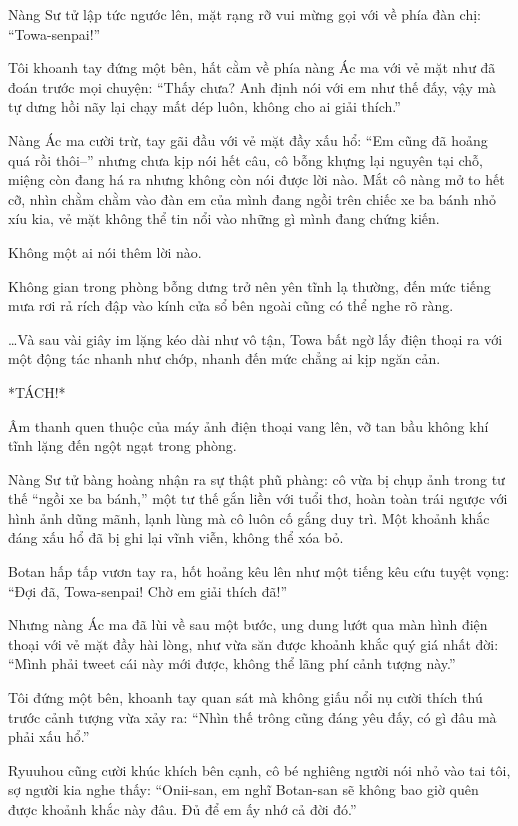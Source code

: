 \documentclass[../main.tex]{subfiles}
\begin{document}
Nàng Sư tử lập tức ngước lên, mặt rạng rỡ vui mừng gọi với về phía đàn chị: ``Towa-senpai!''

Tôi khoanh tay đứng một bên, hất cằm về phía nàng Ác ma với vẻ mặt như đã đoán trước mọi chuyện: ``Thấy chưa? Anh định nói với em như thế đấy, vậy mà tự dưng hồi nãy lại chạy mất dép luôn, không cho ai giải thích.''

Nàng Ác ma cười trừ, tay gãi đầu với vẻ mặt đầy xấu hổ: ``Em cũng đã hoảng quá rồi thôi--'' nhưng chưa kịp nói hết câu, cô bỗng khựng lại nguyên tại chỗ, miệng còn đang há ra nhưng không còn nói được lời nào. Mắt cô nàng mở to hết cỡ, nhìn chằm chằm vào đàn em của mình đang ngồi trên chiếc xe ba bánh nhỏ xíu kia, vẻ mặt không thể tin nổi vào những gì mình đang chứng kiến.

Không một ai nói thêm lời nào.

Không gian trong phòng bỗng dưng trở nên yên tĩnh lạ thường, đến mức tiếng mưa rơi rả rích đập vào kính cửa sổ bên ngoài cũng có thể nghe rõ ràng.

\dots Và sau vài giây im lặng kéo dài như vô tận, Towa bất ngờ lấy điện thoại ra với một động tác nhanh như chớp, nhanh đến mức chẳng ai kịp ngăn cản.

*TÁCH!*


Âm thanh quen thuộc của máy ảnh điện thoại vang lên, vỡ tan bầu không khí tĩnh lặng đến ngột ngạt trong phòng.

Nàng Sư tử bàng hoàng nhận ra sự thật phũ phàng: cô vừa bị chụp ảnh trong tư thế ``ngồi xe ba bánh,'' một tư thế gắn liền với tuổi thơ, hoàn toàn trái ngược với hình ảnh dũng mãnh, lạnh lùng mà cô luôn cố gắng duy trì. Một khoảnh khắc đáng xấu hổ đã bị ghi lại vĩnh viễn, không thể xóa bỏ.

Botan hấp tấp vươn tay ra, hốt hoảng kêu lên như một tiếng kêu cứu tuyệt vọng: ``Đợi đã, Towa-senpai! Chờ em giải thích đã!''

Nhưng nàng Ác ma đã lùi về sau một bước, ung dung lướt qua màn hình điện thoại với vẻ mặt đầy hài lòng, như vừa săn được khoảnh khắc quý giá nhất đời: ``Mình phải tweet cái này mới được, không thể lãng phí cảnh tượng này.''

Tôi đứng một bên, khoanh tay quan sát mà không giấu nổi nụ cười thích thú trước cảnh tượng vừa xảy ra: ``Nhìn thế trông cũng đáng yêu đấy, có gì đâu mà phải xấu hổ.''

Ryuuhou cũng cười khúc khích bên cạnh, cô bé nghiêng người nói nhỏ vào tai tôi, sợ người kia nghe thấy: ``Onii-san, em nghĩ Botan-san sẽ không bao giờ quên được khoảnh khắc này đâu. Đủ để em ấy nhớ cả đời đó.''
\end{document}
